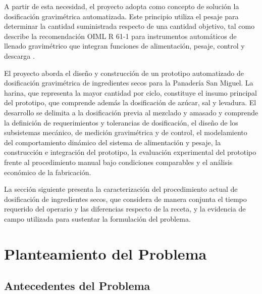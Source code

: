 A partir de esta necesidad, el proyecto adopta como concepto de solución
la dosificación gravimétrica automatizada. Este principio utiliza el
pesaje para determinar la cantidad suministrada respecto de una cantidad
objetivo, tal como describe la recomendación OIML R 61-1 para
instrumentos automáticos de llenado gravimétrico que integran funciones
de alimentación, pesaje, control y descarga \parencite{oiml2017r61}.

El proyecto aborda el diseño y construcción de un prototipo automatizado
de dosificación gravimétrica de ingredientes secos para la Panadería San
Miguel. La harina, que representa la mayor cantidad por ciclo, constituye
el insumo principal del prototipo, que comprende además la dosificación de
azúcar, sal y levadura.
El desarrollo se delimita a la dosificación previa al mezclado y amasado y
comprende la definición de requerimientos y tolerancias de dosificación, el
diseño de los subsistemas mecánico, de medición gravimétrica y de control,
el modelamiento del comportamiento dinámico del sistema de alimentación y
pesaje, la construcción e integración del prototipo, la evaluación
experimental del prototipo frente al procedimiento manual bajo condiciones
comparables y el análisis económico de la fabricación.

La sección siguiente presenta la caracterización del procedimiento actual
de dosificación de ingredientes secos, que considera de manera conjunta el
tiempo requerido del operario y las diferencias respecto de la receta, y la
evidencia de campo utilizada para sustentar la formulación del problema.


\section{Planteamiento del Problema}
\label{sec:problema}


\subsection{Antecedentes del Problema}
\label{subsec:antecedentes_problema}

